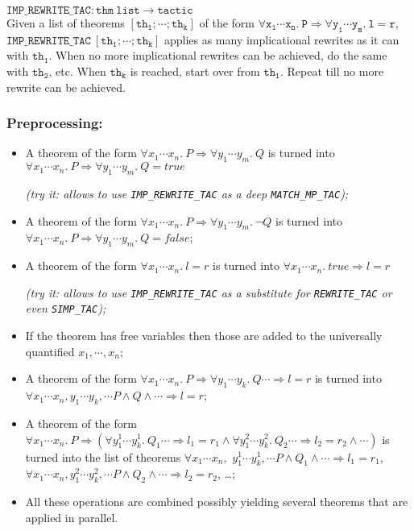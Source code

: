 \documentclass{llncs}
\newcommand*\IMPREWRITETAC{\texttt{IMP\_REWRITE\_TAC}\xspace}
\begin{document}
		$\mathtt{\IMPREWRITETAC: thm\ list \to tactic}$\\
    Given a list of theorems $\mathtt{[th_1;\cdots;th_k]}$ of the form $\mathtt{\forall x_1\cdots x_n.\ P \Rightarrow \forall y_1\cdots y_m.\ l = r}$,
		$\mathtt{\IMPREWRITETAC\ [th_1;\cdots;th_k]}$ applies as many implicational rewrites as it can with $\mathtt{th_1}$.
		When no more implicational rewrites can be achieved, do the same with $\mathtt{th_2}$, etc.
		When $\mathtt{th_k}$ is reached, start over from $\mathtt{th_1}$.
		Repeat till no more rewrite can be achieved.

		\subsubsection{Preprocessing:}

		\begin{itemize}
			\item A theorem of the form $\forall x_1\cdots x_n.\ P \Rightarrow \forall y_1\cdots y_m.\ Q$
				is turned into $\forall x_1\cdots x_n.\ P \Rightarrow \forall y_1\cdots y_m.\ Q=true$

        \emph{(try it: allows to use \IMPREWRITETAC as a \emph{deep} \texttt{MATCH\_MP\_TAC});}

			\item A theorem of the form $\forall x_1\cdots x_n.\ P \Rightarrow \forall y_1\cdots y_m.\ \neg Q$
				is turned into $\forall x_1\cdots x_n.\ P \Rightarrow \forall y_1\cdots y_m.\ Q=false$;

			\item A theorem of the form $\forall x_1\cdots x_n.\ l=r$ is turned into $\forall x_1\cdots x_n.\ true \Rightarrow l=r$

				\emph{(try it: allows to use \IMPREWRITETAC as a substitute for \texttt{REWRITE\_TAC} or even \texttt{SIMP\_TAC});}

			\item If the theorem has free variables then those are added to the universally quantified $x_1,\cdots,x_n$;

      \item A theorem of the form $\forall x_1\cdots x_n.\ P \Rightarrow \forall y_1\cdots y_k.\ Q \cdots \Rightarrow l=r$
        is turned into $\forall x_1\cdots x_n,y_1\cdots y_k,\cdots P \wedge Q \wedge \cdots \Rightarrow l=r$;

      \item A theorem of the form
        $\forall x_1\cdots x_n.\ P \Rightarrow
        (\forall y^1_1\cdots y^1_k.\ Q_1 \cdots \Rightarrow l_1=r_1
        \wedge \forall y^2_1\cdots y^2_k.\ Q_2 \cdots \Rightarrow l_2=r_2
        \wedge \cdots)$ 
        is turned into the list of theorems
        $\forall x_1\cdots x_n,$
        $y^1_1\cdots y^1_k,\cdots P \wedge Q_1 \wedge \cdots \Rightarrow l_1=r_1$,
        $\forall x_1\cdots x_n,y^2_1\cdots y^2_k,\cdots P \wedge Q_2 \wedge \cdots \Rightarrow l_2=r_2$,
        \ldots;

      \item All these operations are combined possibly yielding several theorems that are applied in parallel.
		\end{itemize}
\end{document}
